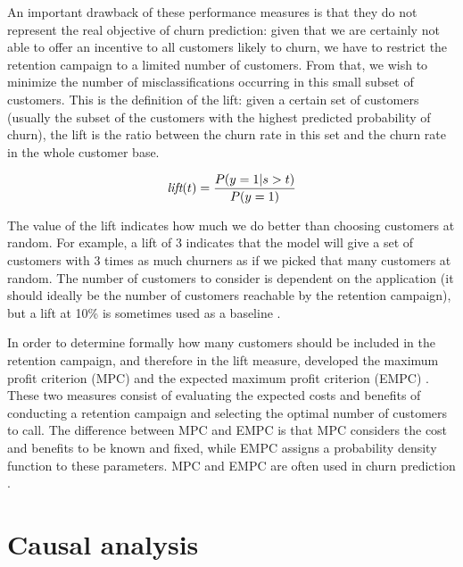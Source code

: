 An important drawback of these performance measures is that they do not
represent the real objective of churn prediction: given that we are
certainly not able to offer an incentive to all customers likely to
churn, we have to restrict the retention campaign to a limited number of
customers. From that, we wish to minimize the number of misclassifications
occurring in this small subset of customers. This is the definition of the lift:
given a certain set of customers (usually the subset of the customers with the
highest predicted probability of churn), the lift is the ratio between the churn
rate in this set and the churn rate in the whole customer base.

\[\textit{lift}(t) = \frac{P(y=1|s>t)}{P(y=1)}\]

The value of the lift indicates how much we do better than choosing customers at
random. For example, a lift of 3 indicates that the model will give a set of
customers with 3 times as much churners as if we picked that many customers at
random. The number of customers to consider is dependent on the application (it
should ideally be the number of customers reachable by the retention campaign),
but a lift at 10\% is sometimes used as a baseline \parencite{zhu2017empirical,
verbeke2014social}.

In order to determine formally how many customers should be included in the
retention campaign, and therefore in the lift measure, \textcite{verbeke2012new}
developed the maximum profit criterion (MPC) and the expected maximum profit
criterion (EMPC) \parencite{verbeke2012new, verbraken2013novel}. These two
measures consist of evaluating the expected costs and benefits of conducting a
retention campaign and selecting the optimal number of customers to call. The
difference between MPC and EMPC is that MPC considers the cost and benefits to
be known and fixed, while EMPC assigns a probability density function to these
parameters. MPC and EMPC are often used in churn prediction
\parencite{zhu2017empirical, oskarsdottir2018time, stripling2018profit}.

\section{Causal analysis}
\label{sec:sota_caus}

